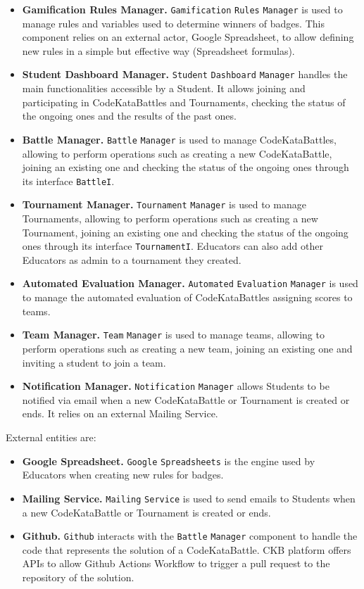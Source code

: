 \begin{itemize}
    \item \textbf{Gamification Rules Manager.} \verb|Gamification| \verb|Rules| \verb|Manager| is used to manage rules and variables used to determine winners of badges. 
    This component relies on an external actor, Google Spreadsheet, to allow defining new rules in a simple but effective way (Spreadsheet formulas).
    \item \textbf{Student Dashboard Manager.} \verb|Student| \verb|Dashboard| \verb|Manager| handles the main functionalities accessible by a Student.
    It allows joining and participating in CodeKataBattles and Tournaments, checking the status of the ongoing ones and the results of the past ones.
    \item \textbf{Battle Manager.} \verb|Battle| \verb|Manager| is used to manage CodeKataBattles, allowing to perform operations such as creating a new CodeKataBattle, 
    joining an existing one and checking the status of the ongoing ones through its interface \verb|BattleI|.
    \item \textbf{Tournament Manager.} \verb|Tournament| \verb|Manager| is used to manage Tournaments, allowing to perform operations such as creating a new Tournament,
    joining an existing one and checking the status of the ongoing ones through its interface \verb|TournamentI|. Educators can also add other Educators as admin to a tournament they created.
    \item \textbf{Automated Evaluation Manager.} \verb|Automated| \verb|Evaluation| \verb|Manager| is used to manage the automated evaluation of CodeKataBattles assigning scores to teams.
    \item \textbf{Team Manager.} \verb|Team| \verb|Manager| is used to manage teams, allowing to perform operations such as creating a new team, joining an existing one and inviting a student to join a team.
    \item \textbf{Notification Manager.} \verb|Notification| \verb|Manager| allows Students to be notified via email when a new CodeKataBattle or Tournament is created or ends. It relies on an external Mailing Service.
\end{itemize}
External entities are:
\begin{itemize}
    \item \textbf{Google Spreadsheet.} \verb|Google| \verb|Spreadsheets| is the engine used by Educators when creating new rules for badges. 
    \item \textbf{Mailing Service.} \verb|Mailing| \verb|Service| is used to send emails to Students when a new CodeKataBattle or Tournament is created or ends.
    \item \textbf{Github.} \verb|Github| interacts with the \verb|Battle| \verb|Manager| component to handle the code that represents the solution of a CodeKataBattle. 
    CKB platform offers APIs to allow Github Actions Workflow to trigger a pull request to the repository of the solution.
\end{itemize}

